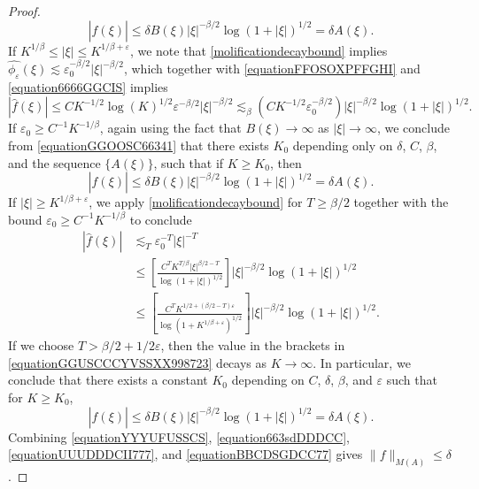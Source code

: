 \documentclass[12pt,reqno]{article}
\numberwithin{equation}{section}
\begin{document}
\begin{proof}
    \begin{equation} \label{equation663sdDDDCC}
        |\widehat{f}(\xi)| \leq \delta B(\xi) |\xi|^{-\beta/2} \log(1 + |\xi|)^{1/2} = \delta A(\xi).
    \end{equation}
    If $K^{1/\beta} \leq |\xi| \leq K^{1/\beta + \varepsilon}$, we note that \eqref{molificationdecaybound} implies $\widehat{\phi_\varepsilon}(\xi) \lesssim \varepsilon_0^{-\beta/2} |\xi|^{-\beta/2}$, which together with \eqref{equationFFOSOXPFFGHI} and \eqref{equation6666GGCIS} implies
    \begin{equation} \label{equationGGOOSC66341}
        |\widehat{f}(\xi)| \leq C K^{-1/2} \log(K)^{1/2} \varepsilon^{-\beta/2} |\xi|^{-\beta/2} \lesssim_\beta \left( C K^{-1/2} \varepsilon_0^{-\beta/2} \right) |\xi|^{-\beta/2} \log(1 + |\xi|)^{1/2}.
    \end{equation}
    If $\varepsilon_0 \geq C^{-1} K^{-1/\beta}$, again using the fact that $B(\xi) \to \infty$ as $|\xi| \to \infty$, we conclude from \eqref{equationGGOOSC66341} that there exists $K_0$ depending only on $\delta$, $C$, $\beta$, and the sequence $\{ A(\xi) \}$, such that if $K \geq K_0$, then
    \begin{equation} \label{equationUUUDDDCII777}
        |\widehat{f}(\xi)| \leq \delta B(\xi) |\xi|^{-\beta/2} \log(1 + |\xi|)^{1/2} = \delta A(\xi).
    \end{equation}
    If $|\xi| \geq K^{1/\beta + \varepsilon}$, we apply \eqref{molificationdecaybound} for $T \geq \beta/2$ together with the bound $\varepsilon_0 \geq C^{-1} K^{-1/\beta}$ to conclude
    \begin{equation} \label{equationGGUSCCCYVSSXX998723}
    \begin{split}
        |\widehat{f}(\xi)| &\lesssim_T \varepsilon_0^{-T} |\xi|^{-T}\\
        &\leq \left[ \frac{C^T K^{T/\beta} |\xi|^{\beta/2 - T}}{\log(1 + |\xi|)^{1/2}} \right] |\xi|^{-\beta/2} \log(1 + |\xi|)^{1/2}\\
        &\leq \left[ \frac{C^T K^{1/2 + (\beta/2 - T) \varepsilon}}{\log(1 + K^{1/\beta + \varepsilon})^{1/2}} \right] |\xi|^{-\beta/2} \log(1 + |\xi|)^{1/2}.
    \end{split}
    \end{equation}
    If we choose $T > \beta/2 + 1/2 \varepsilon$, then the value in the brackets in \eqref{equationGGUSCCCYVSSXX998723} decays as $K \to \infty$. In particular, we conclude that there exists a constant $K_0$ depending on $C$, $\delta$, $\beta$, and $\varepsilon$ such that for $K \geq K_0$,
    \begin{equation} \label{equationBBCDSGDCC77}
        |\widehat{f}(\xi)| \leq \delta B(\xi) |\xi|^{-\beta/2} \log(1 + |\xi|)^{1/2} = \delta A(\xi).
    \end{equation}
    Combining \eqref{equationYYYUFUSSCS}, \eqref{equation663sdDDDCC}, \eqref{equationUUUDDDCII777}, and \eqref{equationBBCDSGDCC77} gives $\| f \|_{M(A)} \leq \delta$.
\end{proof}
\end{document}
